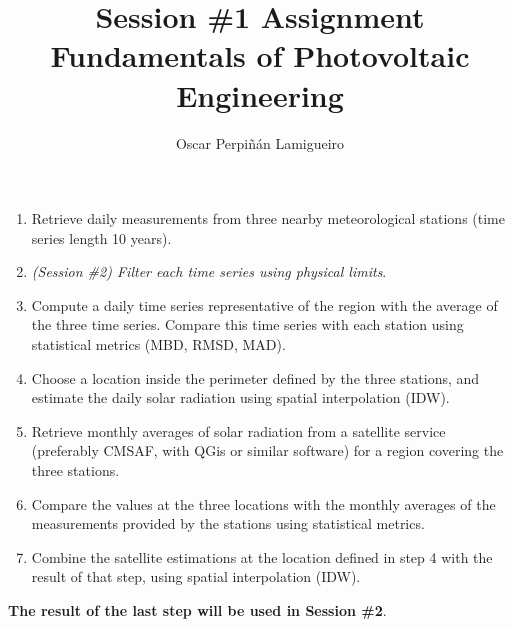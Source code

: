 \documentclass[11pt]{article}
\author{Oscar Perpiñán Lamigueiro}
\date{}
\title{Session \#1 Assignment\\\medskip
\large Fundamentals of Photovoltaic Engineering}
\begin{document}
\maketitle
\begin{enumerate}
\item Retrieve daily measurements from three nearby meteorological stations (time series length 10 years).
\item \emph{(Session \#2) Filter each time series using physical limits}.
\item Compute a daily time series representative of the region with the average of the three time series. Compare this time series with each station using statistical metrics (MBD, RMSD, MAD).
\item Choose a location inside the perimeter defined by the three stations, and estimate the daily solar radiation using spatial interpolation (IDW).
\item Retrieve monthly averages of solar radiation from a satellite service (preferably CMSAF, with QGis or similar software) for a region covering the three stations.
\item Compare the values at the three locations with the monthly averages of the measurements provided by the stations using statistical metrics.
\item Combine the satellite estimations at the location defined in step 4 with the result of that step, using spatial interpolation (IDW).
\end{enumerate}

\textbf{The result of the last step will be used in Session \#2}.
\end{document}
